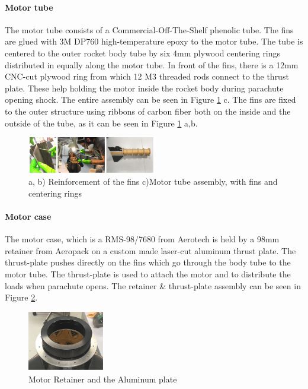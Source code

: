\paragraph{Motor tube}
\hfill \break
The motor tube consists of a Commercial-Off-The-Shelf phenolic tube. The fins are glued with 3M DP760 high-temperature epoxy to the motor tube. The tube is centered to the outer rocket body tube by six 4mm plywood centering rings distributed in equally along the motor tube.
In front of the fins, there is a 12mm CNC-cut plywood ring from which 12 M3 threaded rods connect to the thrust plate. These help holding the motor inside the rocket body during parachute opening shock.
The entire assembly can be seen in Figure \ref{f:reinforcement} c. The fins are fixed to the outer structure using ribbons of carbon fiber both on the inside and the outside of the tube, as it can be seen in Figure \ref{f:reinforcement} a,b.

  \begin{figure}[h!]
\centering
\includegraphics[width=0.5\textwidth]{img/fins_glue.jpg}
\caption{a, b) Reinforcement of the fins c)Motor tube assembly, with fins and centering rings}
\label{f:reinforcement}
\end{figure}


\paragraph{Motor case}
\hfill \break
The motor case, which is a RMS-98/7680 from Aerotech is held by a 98mm retainer from Aeropack on a custom made laser-cut aluminum thrust plate. The thrust-plate pushes directly on the fins which go through the body tube to the motor tube. The thrust-plate is used to attach the motor and to distribute the loads when parachute opens.
 The retainer \& thrust-plate assembly can be seen in Figure \ref{f:motor_retainer_2}.
\begin{figure}[h!]
        \centering
        \includegraphics[width=0.3\textwidth]{img/motor_retainer.jpg}
        \caption{Motor Retainer and the Aluminum plate}
        \label{f:motor_retainer_2}
    \end{figure}


